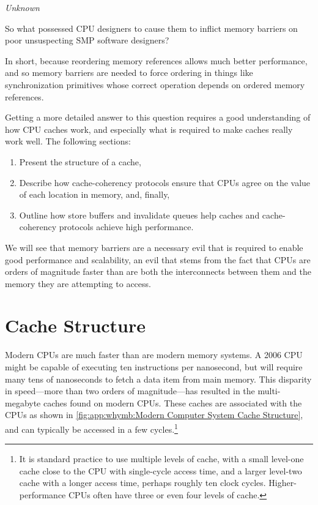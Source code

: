 
%
	 {\emph{Unknown}}

So what possessed CPU designers to cause them to inflict memory barriers
on poor unsuspecting SMP software designers?

In short, because reordering memory references allows much better performance,
and so memory barriers are needed to force ordering in things like
synchronization primitives whose correct operation depends on ordered
memory references.

Getting a more detailed answer to this question requires a good understanding
of how CPU caches work, and especially what is required to make
caches really work well.
The following sections:
\begin{enumerate}
\item	Present the structure of a cache,
\item	Describe how cache-coherency protocols ensure that CPUs agree
	on the value of each location in memory, and, finally,
\item	Outline how store buffers and invalidate queues help
	caches and cache-coherency protocols achieve high performance.
\end{enumerate}
We will see that memory barriers are a necessary evil that is required
to enable good performance and scalability, an evil that stems from
the fact that CPUs are orders of magnitude faster than are both the
interconnects between them and the memory they are attempting to access.

\section{Cache Structure}
\label{sec:app:whymb:Cache Structure}

Modern CPUs are much faster than are modern memory systems.
A 2006 CPU might be capable of executing ten instructions per nanosecond,
but will require many tens of nanoseconds to fetch a data item from
main memory.
This disparity in speed---more than two orders of magnitude---has
resulted in the multi-megabyte caches found on modern CPUs.
These caches are associated with the CPUs as shown in
\cref{fig:app:whymb:Modern Computer System Cache Structure},
and can typically be accessed in a few cycles.\footnote{
	It is standard practice to use multiple levels of cache,
	with a small level-one cache close to the CPU with
	single-cycle access time, and a larger level-two cache
	with a longer access time, perhaps roughly ten clock cycles.
	Higher-performance CPUs often have three or even four levels
	of cache.}

